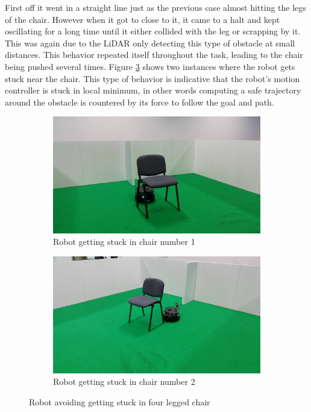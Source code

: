 First off it went in a straight line just as the previous case almost hitting  the legs of the chair. However when it got to close to it, it came to a halt and kept oscillating for a long time until it either collided with the leg or scrapping by it. This was again due to the \ac{LiDAR} only detecting this type of obstacle at small distances. This behavior repeated itself throughout the task, leading to the chair being pushed several times. Figure \ref{fig:nchairLF} shows two instances where the robot gets stuck near the chair. This type of behavior is indicative that the robot's motion controller is stuck in local minimum, in other words computing a safe trajectory around the obstacle is countered by its force to follow the goal and path.
\begin{figure}[h!]
  \centering
  \begin{subfigure}[b]{0.49\linewidth}
    \includegraphics[width=\linewidth]{imgs/chapter5/nchairLF.png}
     \caption{Robot getting stuck in chair number 1}
     \label{fig::wchair}
  \end{subfigure}
  \begin{subfigure}[b]{0.49\linewidth}
    \includegraphics[width=\linewidth]{imgs/chapter5/nchairLF2.png}
    \caption{Robot getting stuck in chair number 2}
    \label{fig::nchair}
  \end{subfigure}
  \caption{Robot avoiding getting stuck in four legged chair}
  \label{fig:nchairLF}
\end{figure}

